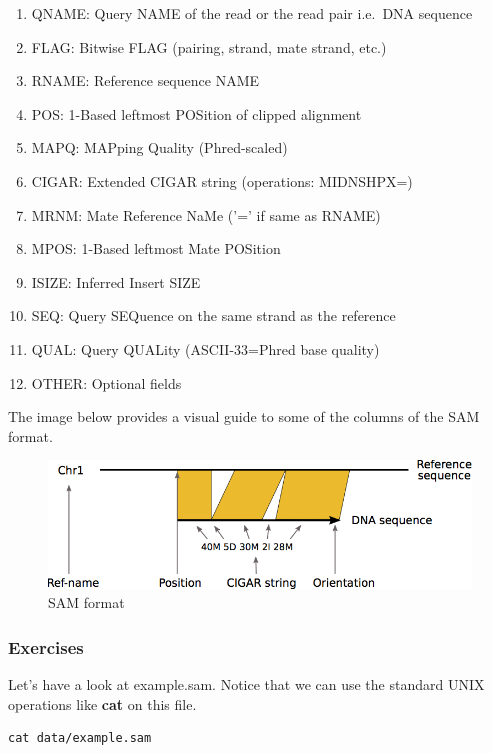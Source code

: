 \documentclass[11pt]{article}
\makeatletter
\providecommand{\tightlist}{%
      \setlength{\itemsep}{0pt}\setlength{\parskip}{0pt}}
\newcommand{\boxspacing}{\kern\kvtcb@left@rule\kern\kvtcb@boxsep}
\newcommand{\prompt}[4]{
        {\ttfamily\llap{{\color{#2}[#3]:\hspace{3pt}#4}}\vspace{-\baselineskip}}
    }
\makeatother
\begin{document}
\begin{enumerate}
\def\labelenumi{\arabic{enumi}.}
\tightlist
\item
  QNAME: Query NAME of the read or the read pair i.e.~DNA sequence
\item
  FLAG: Bitwise FLAG (pairing, strand, mate strand, etc.)
\item
  RNAME: Reference sequence NAME
\item
  POS: 1-Based leftmost POSition of clipped alignment
\item
  MAPQ: MAPping Quality (Phred-scaled)
\item
  CIGAR: Extended CIGAR string (operations: MIDNSHPX=)
\item
  MRNM: Mate Reference NaMe ('=' if same as RNAME)
\item
  MPOS: 1-Based leftmost Mate POSition
\item
  ISIZE: Inferred Insert SIZE
\item
  SEQ: Query SEQuence on the same strand as the reference
\item
  QUAL: Query QUALity (ASCII-33=Phred base quality)
\item
  OTHER: Optional fields
\end{enumerate}

The image below provides a visual guide to some of the columns of the
SAM format.

    \begin{figure}
\centering
\includegraphics{img/SAM_BAM.png}
\caption{SAM format}
\end{figure}

    \hypertarget{exercises}{%
\subsubsection{Exercises}\label{exercises}}

Let's have a look at example.sam. Notice that we can use the standard
UNIX operations like \textbf{cat} on this file.

    \begin{tcolorbox}[breakable, size=fbox, boxrule=1pt, pad at break*=1mm,colback=cellbackground, colframe=cellborder]
\prompt{In}{incolor}{ }{\boxspacing}
\begin{Verbatim}[commandchars=\\\{\}]
cat data/example.sam
\end{Verbatim}
\end{tcolorbox}
\end{document}
